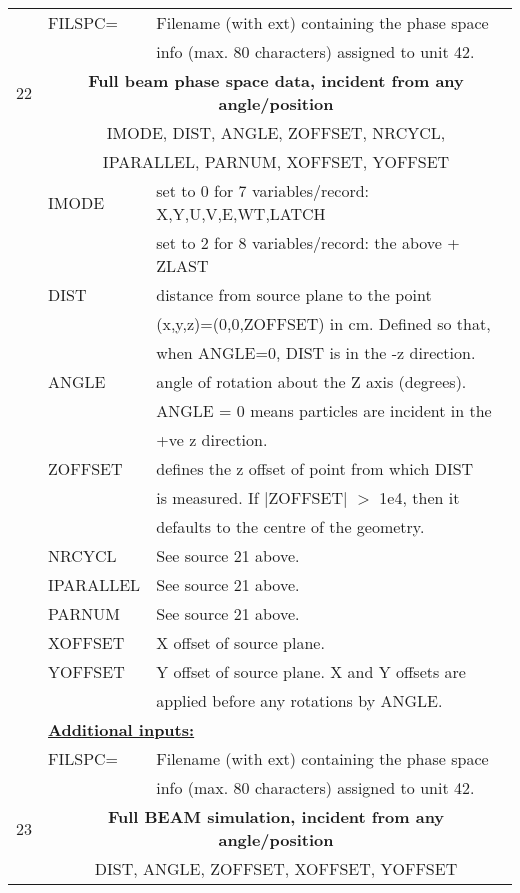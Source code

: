 \begin{longtable}{lll}
  & FILSPC=  & Filename (with ext) containing the phase space\\
  &         & info (max. 80 characters) assigned  to unit 42.\\
\hline
22&\multicolumn{2}{c}{\bf Full beam phase space data, incident from any angle/position}\\
  &\multicolumn{2}{c}{IMODE, DIST, ANGLE, ZOFFSET, NRCYCL,}\\
  &\multicolumn{2}{c}{IPARALLEL, PARNUM, XOFFSET, YOFFSET}\\
  & IMODE & set to 0 for 7 variables/record: X,Y,U,V,E,WT,LATCH \\
  &  & set to 2 for 8 variables/record: the above + ZLAST \\
  & DIST & distance from source plane to the point\\
  &      & (x,y,z)=(0,0,ZOFFSET) in cm.  Defined so that,\\
  &      &  when ANGLE=0, DIST is in the -z direction.\\
  & ANGLE & angle of rotation about the Z axis (degrees).  \\ 
  &       &  ANGLE = 0 means particles are incident in the \\
  &       & +ve z direction.\\
  & ZOFFSET & defines the z offset of point from which DIST\\
  &         &  is measured. If $|$ZOFFSET$|$ $>$ 1e4, then it\\
  &         & defaults to the centre of the geometry.\\
  & NRCYCL & See source 21 above.\\
  & IPARALLEL & See source 21 above.\\
  & PARNUM & See source 21 above.\\
  & XOFFSET & X offset of source plane.\\
  & YOFFSET & Y offset of source plane.  X and Y offsets are\\
  &         & applied before any rotations by ANGLE.\\ 
& \multicolumn{2}{l}{\bf \underline {Additional inputs:}}\\
  & FILSPC=  & Filename (with ext) containing the phase space\\
  &         & info (max. 80 characters) assigned  to unit 42.\\
\hline
23&\multicolumn{2}{c}{\bf Full BEAM simulation, incident from any angle/position}\\
  &\multicolumn{2}{c}{DIST, ANGLE, ZOFFSET, XOFFSET, YOFFSET}\\

\end{longtable}
